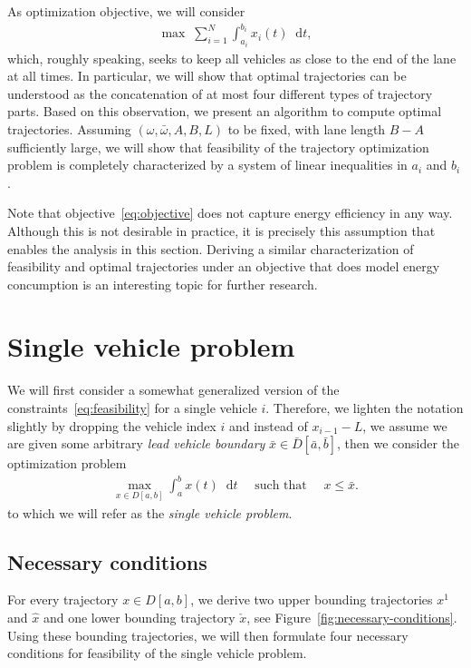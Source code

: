 \documentclass[a4paper]{article}
\theoremstyle{definition}
\theoremstyle{plain}
\newcommand*\diff{\mathop{}\!\mathrm{d}}
\begin{document}
\pagebreak

As optimization objective, we will consider
\begin{align}\label{eq:objective}
  \max \; \sum_{i=1}^{N} \int_{a_{i}}^{b_{i}} x_{i}(t) \diff t ,
\end{align}
which, roughly speaking, seeks to keep all vehicles as close to the end of the
lane at all times.
%
In particular, we will show that optimal trajectories can be understood as the
concatenation of at most four different types of trajectory parts. Based on this
observation, we present an algorithm to compute optimal trajectories.
%
Assuming $(\omega, \bar{\omega},A,B,L)$ to be fixed, with lane length $B-A$
sufficiently large, we will show that feasibility of the trajectory optimization
problem is completely characterized by a system of linear inequalities in
$a_{i}$ and $b_{i}$.

Note that objective~\eqref{eq:objective} does not capture energy efficiency in
any way. Although this is not desirable in practice, it is precisely this
assumption that enables the analysis in this section. Deriving a similar
characterization of feasibility and optimal trajectories under an objective that
does model energy concumption is an interesting topic for further research.

\section{Single vehicle problem}

We will first consider a somewhat generalized version of the
constraints~\eqref{eq:feasibility} for a single vehicle $i$. Therefore, we
lighten the notation slightly by dropping the vehicle index $i$ and instead of
$x_{i-1} - L$, we assume we are given some arbitrary \emph{lead vehicle
  boundary} $\bar{x} \in \bar{D}[\bar{a}, \bar{b}]$, then we consider the
optimization problem
\begin{align}
  \max_{x \in D[a, b]} \int_{a}^{b} x(t) \diff t \quad \text{ such that } \quad x \leq \bar{x} .
\end{align}
to which we will refer as the \emph{single vehicle problem}.

\subsection{Necessary conditions}

For every trajectory $x \in D[a,b]$, we derive two upper
bounding trajectories $x^{1}$ and $\hat{x}$ and one lower bounding trajectory
$\check{x}$, see Figure~\ref{fig:necessary-conditions}.
%
Using these bounding trajectories, we will then formulate four necessary
conditions for feasibility of the single vehicle problem.
\end{document}
